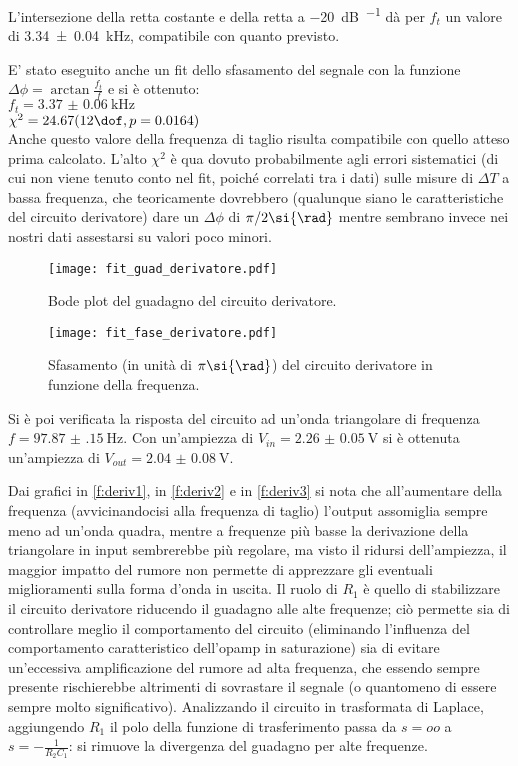 L'intersezione della retta costante e della retta a \SI{-20}{\dB\per\deca} dà per $f_t$ un valore di \SI{3.34(4)}{\kHz}, compatibile con quanto previsto.

E' stato eseguito anche un fit dello sfasamento del segnale con la funzione $\Delta \phi= \arctan{\frac{f_t}{f}}$ e si è ottenuto:\\
$f_t= \SI{3.37(6)}{\kHz}$\\
$\chi^2=24.67 (12 \dof, p = 0.0164)$\\
Anche questo valore della frequenza di taglio risulta compatibile con quello atteso prima calcolato. L'alto $\chi^2$ è qua dovuto probabilmente agli errori sistematici (di cui non viene tenuto conto nel fit, poiché correlati tra i dati) sulle misure di $\Delta T$ a bassa frequenza, che teoricamente dovrebbero (qualunque siano le caratteristiche del circuito derivatore) dare un $\Delta \phi$ di $\pi/2\si{\rad}$ mentre sembrano invece nei nostri dati assestarsi su valori poco minori.

\begin{figure}[h]
	\centering
	\texttt{[image: fit\_guad\_derivatore.pdf]}
	\caption{Bode plot del guadagno del circuito derivatore.}
	\label{f:guad_deriv}
\end{figure}

\begin{figure}[h]
	\centering
	\texttt{[image: fit\_fase\_derivatore.pdf]}
	\caption{Sfasamento (in unità di $\pi\si{\rad}$) del circuito derivatore in funzione della frequenza.}
	\label{f:fase_deriv}
\end{figure}

Si è poi verificata la risposta del circuito ad un'onda triangolare di frequenza $f= \SI{97.87(15)}{\Hz}$. Con un'ampiezza di $V_{in}=\SI{2.26(5)}{\V}$ si è ottenuta un'ampiezza di $V_{out}=\SI{2.04(8)}{\V}$.

Dai grafici in \ref{f:deriv1}, in \ref{f:deriv2} e in \ref{f:deriv3} si nota che all'aumentare della frequenza (avvicinandocisi alla frequenza di taglio) l'output assomiglia sempre meno ad un'onda quadra, mentre a frequenze più basse la derivazione della triangolare in input sembrerebbe più regolare, ma visto il ridursi dell'ampiezza, il maggior impatto del rumore non permette di apprezzare gli eventuali miglioramenti sulla forma d'onda in uscita.
Il ruolo di $R_1$ è quello di stabilizzare il circuito derivatore riducendo il guadagno alle alte frequenze; ciò permette sia di controllare meglio il comportamento del circuito (eliminando l'influenza del comportamento caratteristico dell'opamp in saturazione) sia di evitare un'eccessiva amplificazione del rumore ad alta frequenza, che essendo sempre presente rischierebbe altrimenti di sovrastare il segnale (o quantomeno di essere sempre molto significativo). Analizzando il circuito in trasformata di Laplace, aggiungendo $R_1$ il polo della funzione di trasferimento passa da $s=oo$ a $s = -\frac{1}{R_2C_1}$: si rimuove la divergenza del guadagno per alte frequenze.


